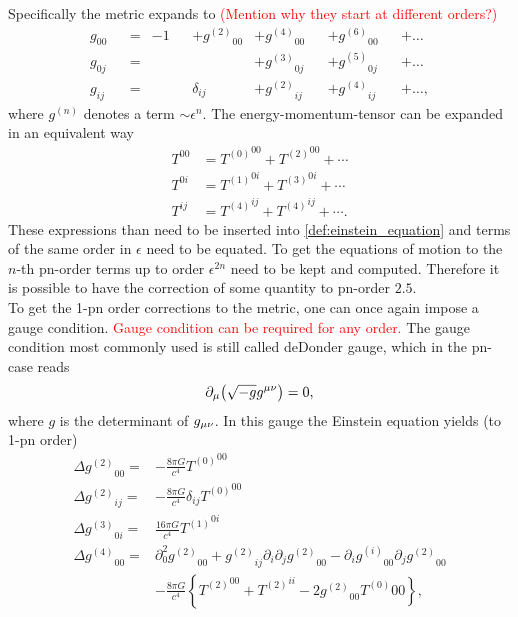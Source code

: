 Specifically the metric expands to \textcolor{red}{(Mention why they start at different orders?)}
\begin{align}\label{def:pn_expansion_metric}
g_{00} && = & -1 && +{g^{(2)}}_{00} & +{g^{(4)}}_{00} && +{g^{(6)}}_{00} && +\dotsc\nonumber\\
g_{0j} && = & && & +{g^{(3)}}_{0j} && +{g^{(5)}}_{0j} && +\dotsc\\
g_{ij} && = & &&\delta_{ij} & +{g^{(2)}}_{ij} && +{g^{(4)}}_{ij} && +\dotsc,\nonumber
\end{align}
where ${g^{(n)}}$ denotes a term $\sim \epsilon^n$. The energy-momentum-tensor can be expanded in an equivalent way
\begin{align}\label{def:pn_expansion_energy_momentum_tensor}
T^{00} & = {T^{(0)}}^{00}+{T^{(2)}}^{00}+\cdots\nonumber\\
T^{0i} & = {T^{(1)}}^{0i}+{T^{(3)}}^{0i}+\cdots\\
T^{ij} & = {T^{(4)}}^{ij}+{T^{(4)}}^{ij}+\cdots.\nonumber
\end{align}
These expressions than need to be inserted into \eqref{def:einstein_equation} and terms of the same order in $\epsilon$ need to be equated. To get the equations of motion to the $n$-th \gls{pn}-order terms up to order $\epsilon^{2n}$ need to be kept and computed. Therefore it is possible to have the correction of some quantity to \gls{pn}-order $2.5$.\\
To get the 1-\gls{pn} order corrections to the metric, one can once again impose a gauge condition. \textcolor{red}{Gauge condition can be required for any order.} The gauge condition most commonly used is still called deDonder gauge, which in the \gls{pn}-case reads
\begin{equation}
\partial_\mu{\left( \sqrt{-g}g^{\mu\nu}\right)}=0,
\end{equation}
where $g$ is the determinant of $g_{\mu\nu}$. In this gauge the Einstein equation yields (to 1-\gls{pn} order)
\begin{align}\label{def:metric_differential_equation_pn_1}
\Delta {g^{(2)}}_{00} = & -\frac{8\pi G}{c^4}{T^{(0)}}^{00}\nonumber\\
\Delta {g^{(2)}}_{ij} = & -\frac{8\pi G}{c^4}\delta_{ij}{T^{(0)}}^{00}\nonumber\\
\Delta {g^{(3)}}_{0i} = & \frac{16\pi G}{c^4}{T^{(1)}}^{0i}\\
\Delta {g^{(4)}}_{00} = & \partial_0^2{g^{(2)}}_{00} + {g^{(2)}}_{ij}\partial_i\partial_j{g^{(2)}}_{00}-\partial_i{g^{(i)}}_{00}\partial_j{g^{(2)}}_{00}\nonumber\\
& -\frac{8\pi G}{c^4}\left\{{T^{(2)}}^{00}+{T^{(2)}}^{ii}-2{g^{(2)}}_{00}{T^{(0)}}{00}\right\},\nonumber
\end{align}
